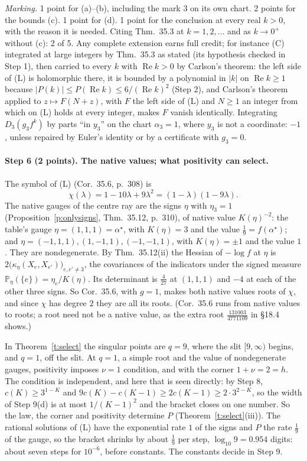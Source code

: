 \documentclass[11pt]{article}
\DeclareMathOperator{\re}{Re}
\theoremstyle{plain}
\theoremstyle{definition}
\theoremstyle{remark}
\begin{document}
\smallskip\noindent\emph{Marking.} 1 point for (a)--(b), including the mark $3$ on its own chart. 2 points for the bounds (c). 1 point for (d). 1 point for the conclusion at every real $k>0$, with the reason it is needed. Citing Thm.~35.3 at $k=1,2,\dots$ and as $k\to0^+$ without (c): 2 of 5. Any complete extension earns full credit; for instance (C) integrated at large integers by Thm.~35.3 as stated (its hypothesis checked in Step 1), then carried to every $k$ with $\re k>0$ by Carlson's theorem: the left side of (L) is holomorphic there, it is bounded by a polynomial in $|k|$ on $\re k\ge1$ because $|P(k)|\le P(\re k)\le6/(\re k)^2$ (Step 2), and Carlson's theorem applied to $z\mapsto F(N+z)$, with $F$ the left side of (L) and $N\ge1$ an integer from which on (L) holds at every integer, makes $F$ vanish identically. Integrating $D_3(g_3f^k)$ by parts ``in $y_3$'' on the chart $\alpha_3=1$, where $y_3$ is not a coordinate: $-1$, unless repaired by Euler's identity or by a certificate with $g_3=0$.

\paragraph{Step 6 (2 points). The native values; what positivity can select.}
The symbol of (L) (Cor.~35.6, p.~308) is
\[
\chi(\lambda)=1-10\lambda+9\lambda^2=(1-\lambda)(1-9\lambda).
\]
The native gauges of the centre ray are the signs $\eta$ with $\eta_3=1$ (Proposition~\ref{p:onlysigns}, Thm.~35.12, p.~310), of native value $K(\eta)^{-2}$: the table's gauge $\eta=(1,1,1)=\alpha^\star$, with $K(\eta)=3$ and the value $\frac19=f(\alpha^\star)$; and $\eta=(-1,1,1),(1,-1,1),(-1,-1,1)$, with $K(\eta)=\pm1$ and the value $1$. They are nondegenerate. By Thm.~35.12(ii) the Hessian of $-\log f$ at $\eta$ is $2\big(\kappa_\eta(X_e,X_{e'})\big)_{e,e'\neq3}$, the covariances of the indicators under the signed measure $\mathbb P_\eta(\{e\})=\eta_e/K(\eta)$. Its determinant is $\frac4{27}$ at $(1,1,1)$ and $-4$ at each of the other three signs. So Cor.~35.6, with $g=1$, makes both native values roots of $\chi$, and since $\chi$ has degree $2$ they are all its roots. (Cor.~35.6 runs from native values to roots; a root need not be a native value, as the extra root $\frac{131003}{4771109}$ in \S18.4 shows.)

In Theorem~\ref{t:select} the singular points are $q=9$, where the slit $[9,\infty)$ begins, and $q=1$, off the slit. At $q=1$, a simple root and the value of nondegenerate gauges, positivity imposes $\nu=1$ condition, and with the corner $1+\nu=2=h$. The condition is independent, and here that is seen directly: by Step 8, $c(K)\ge3^{1-K}$ and $9c(K)-c(K-1)\ge2c(K-1)\ge2\cdot3^{2-K}$, so the width of Step 9(d) is at most $1/(K-1)^2$ and the bracket closes on one number. So the law, the corner and positivity determine $P$ (Theorem~\ref{t:select}(iii)). The rational solutions of (L) have the exponential rate $1$ of the signs and $P$ the rate $\frac19$ of the gauge, so the bracket shrinks by about $\frac19$ per step, $\log_{10}9=0.954$ digits: about seven steps for $10^{-6}$, before constants. The constants decide in Step 9.
\end{document}
